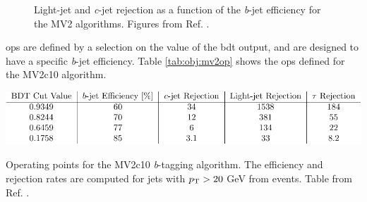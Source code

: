 \begin{figure}[h]
\begin{center}
\end{center}
 \caption{Light-jet  and \textit{c}-jet  rejection as a function of the \textit{b}-jet efficiency for the MV2 algorithms. Figures from Ref. \cite{ATL-PHYS-PUB-2016-012}.}
  \label{fig:obj:mv2}
\end{figure}

\glspl{op} are defined by a selection on the value of the \gls{bdt} output, and are designed to have a specific \textit{b}-jet efficiency.
Table \ref{tab:obj:mv2op} shows the \glspl{op} defined for the MV2c10 algorithm.

\begin{table}[h]
\begin{center}
    \includegraphics[width=1.0\textwidth]{figures/objects/btag_op.pdf}  
\end{center}
 \caption{Operating points for the MV2c10 \textit{b}-tagging algorithm. The efficiency and rejection rates are computed for jets with $p_{\rm T} > 20$ GeV from \ttbar events. Table from Ref. \cite{ATL-PHYS-PUB-2016-012}.}
  \label{tab:obj:mv2op}
\end{table}

